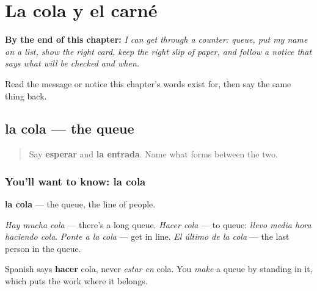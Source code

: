 
\chapter{La cola y el carné}
\label{ch:es-turno}

\begin{chapteropening}
\textbf{By the end of this chapter:} \emph{I can get through a counter: queue, put my name on a list, show the right card, keep the right slip of paper, and follow a notice that says what will be checked and when.}

Read the message or notice this chapter's words exist for, then say the same thing back.
\end{chapteropening}

\section[la cola]{la cola — the queue}

\label{lesson:ES-C451-cola}



\begin{quote}
Say \textbf{esperar} and \textbf{la entrada}. Name what forms between the two.
\end{quote}

\subsection*{You'll want to know: la cola}
\textbf{la cola} — the queue, the line of people.

\emph{Hay mucha cola} — there's a long queue. \emph{Hacer cola} — to queue: \emph{llevo media hora haciendo cola}. \emph{Ponte a la cola} — get in line. \emph{El último de la cola} — the last person in the queue.

Spanish says \textbf{hacer} cola, never \emph{estar en} cola. You \emph{make} a queue by standing in it, which puts the work where it belongs.

